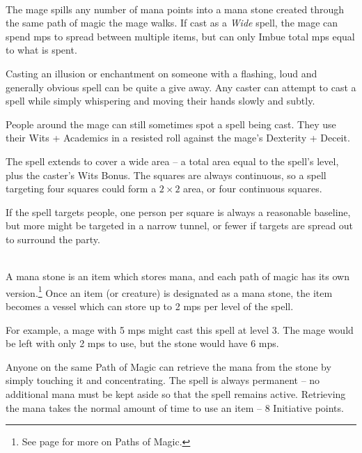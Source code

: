 \begin{multicols}{2}
\spelllevel

\\
The mage spills any number of mana points into a mana stone created through the same path of magic the mage walks.
If cast as a \textit{Wide} spell, the mage can spend \glspl{mp} to spread between multiple items, but can only Imbue total \glspl{mp} equal to what is spent.


Casting an illusion or enchantment on someone with a flashing, loud and generally obvious spell can be quite a give away.
Any caster can attempt to cast a spell while simply whispering and moving their hands slowly and subtly.

People around the mage can still sometimes spot a spell being cast. They use their Wits + Academics in a resisted roll against the mage's Dexterity + Deceit.

The spell extends to cover a wide area -- a total area equal to the spell's level, plus the caster's Wits Bonus.
The squares are always continuous, so a spell targeting four squares could form a $2\times 2$ area, or four continuous squares.

If the spell targets people, one person per square is always a reasonable baseline, but more might be targeted in a narrow tunnel, or fewer if targets are spread out to surround the party.

\spelllevel

\\
A mana stone is an item which stores mana, and each path of magic has its own version.\footnote{See page \pageref{magic_paths} for more on Paths of Magic.}
Once an item (or creature) is designated as a mana stone, the item becomes a vessel which can store up to 2 \glspl{mp} per level of the spell.

For example, a mage with 5 \glspl{mp} might cast this spell at level 3.
The mage would be left with only 2 \glspl{mp} to use, but the stone would have 6 \glspl{mp}.

Anyone on the same Path of Magic can retrieve the mana from the stone by simply touching it and concentrating.
The spell is always permanent -- no additional mana must be kept aside so that the spell remains active.
Retrieving the mana takes the normal amount of time to use an item -- 8 Initiative points.


\end{multicols}
